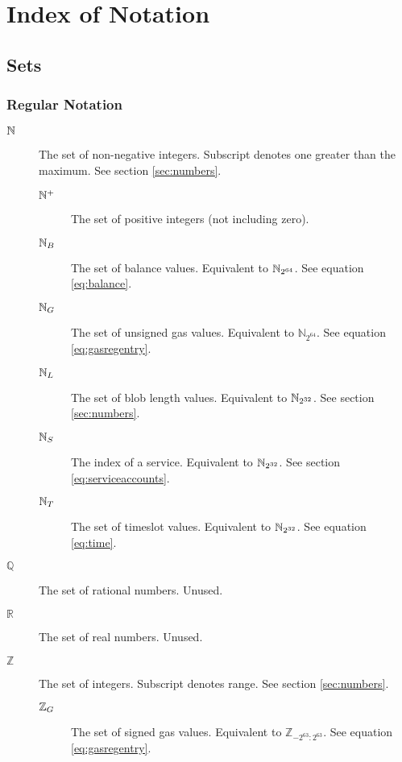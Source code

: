 \section{Index of Notation}\label{sec:definitions}

\subsection{Sets}

\subsubsection{Regular Notation}
\begin{description}
  \item[$\mathbb{N}$] The set of non-negative integers. Subscript denotes one greater than the maximum. See section \ref{sec:numbers}.
  \begin{description}
    \item[$\mathbb{N}^+$] The set of positive integers (not including zero).
    \item[$\mathbb{N}_B$] The set of balance values. Equivalent to $\mathbb{N}_{2^{64}}$. See equation \ref{eq:balance}.
    \item[$\mathbb{N}_G$] The set of unsigned gas values. Equivalent to $\mathbb{N}_{2^{64}}$. See equation \ref{eq:gasregentry}.
    \item[$\mathbb{N}_L$] The set of blob length values. Equivalent to $\mathbb{N}_{2^{32}}$. See section \ref{sec:numbers}.
    \item[$\mathbb{N}_S$] The index of a service. Equivalent to $\mathbb{N}_{2^{32}}$. See section \ref{eq:serviceaccounts}.
    \item[$\mathbb{N}_T$] The set of timeslot values. Equivalent to $\mathbb{N}_{2^{32}}$. See equation \ref{eq:time}.
  \end{description}
  \item[$\mathbb{Q}$] The set of rational numbers. Unused.
  \item[$\mathbb{R}$] The set of real numbers. Unused.
  \item[$\mathbb{Z}$] The set of integers. Subscript denotes range. See section \ref{sec:numbers}.
  \begin{description}
    \item[$\mathbb{Z}_G$] The set of signed gas values. Equivalent to $\mathbb{Z}_{-2^{63}:2^{63}}$. See equation \ref{eq:gasregentry}.
  \end{description}
\end{description}

